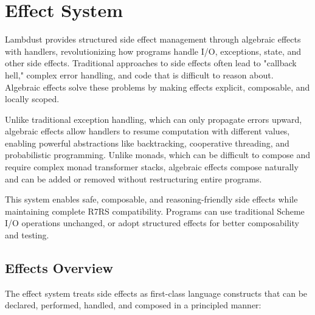 \chapter{Effect System}
\label{ch:effects}

Lambdust provides structured side effect management through algebraic effects with handlers, revolutionizing how programs handle I/O, exceptions, state, and other side effects. Traditional approaches to side effects often lead to "callback hell," complex error handling, and code that is difficult to reason about. Algebraic effects solve these problems by making effects explicit, composable, and locally scoped.

Unlike traditional exception handling, which can only propagate errors upward, algebraic effects allow handlers to resume computation with different values, enabling powerful abstractions like backtracking, cooperative threading, and probabilistic programming. Unlike monads, which can be difficult to compose and require complex monad transformer stacks, algebraic effects compose naturally and can be added or removed without restructuring entire programs.

This system enables safe, composable, and reasoning-friendly side effects while maintaining complete R7RS compatibility. Programs can use traditional Scheme I/O operations unchanged, or adopt structured effects for better composability and testing.

\section{Effects Overview}
\label{sec:effects-overview}

The effect system treats side effects as first-class language constructs that can be declared, performed, handled, and composed in a principled manner:

